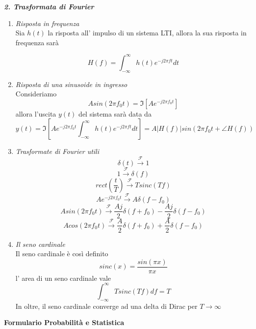 \documentclass[]{article}
\begin{document}
\textit{\textbf{2. Trasformata di Fourier}}

\begin{enumerate}
\item \textit{Risposta in frequenza}
\\
Sia $h(t)$ la risposta all' impulso di un sistema LTI, allora la sua risposta in frequenza sarà

\begin{equation}
H(f)= \int_{- \infty}^{\infty} h(t) e^{-j2 \pi f t} dt
\end{equation}

\item \textit{Risposta di una sinusoide in ingresso}
\\
Consideriamo 
\[ Asin(2 \pi f_0 t)= \Im \left[ Ae^{-j2 \pi f_0 t} \right]\]
allora l'uscita $y(t)$ del sistema sarà data da
\begin{equation}
y(t)= \Im \left[ Ae^{-j2 \pi f_0 t} \int_{- \infty}^{\infty} h(t) e^{-j2 \pi f t} dt \right]= A |H(f)| sin( 2 \pi f_0 t + \angle H(f))
\end{equation}
\item \textit{Trasformate di Fourier utili}
\[\delta(t) \xrightarrow{\mathscr{F}}  1\]
\[1 \xrightarrow{\mathscr{F}}  \delta(f)\]
\[rect \left( \frac{t}{T} \right) \xrightarrow{\mathscr{F}}  T sinc(Tf)\]
\[Ae^{-j2 \pi f_0 t} \xrightarrow{\mathscr{F}} A \delta(f-f_0) \]
\[Asin(2 \pi f_0 t) \xrightarrow{\mathscr{F}}  \frac{Aj}{2} \delta(f+f_0) - \frac{Aj}{2} \delta(f-f_0)\]
\[Acos(2 \pi f_0 t) \xrightarrow{\mathscr{F}}  \frac{A}{2} \delta(f+f_0) + \frac{A}{2} \delta(f-f_0)\]

\item \textit{Il seno cardinale}
\\
Il seno cardinale è così definito
\begin{equation}
sinc(x)= \frac{sin(\pi x)}{\pi x}
\end{equation}
l' area di un seno cardinale vale
\begin{equation}
\int_{- \infty}^{\infty} Tsinc(Tf) df = T
\end{equation}
In oltre, il seno cardinale converge ad una delta di Dirac per $T \to \infty$
\end{enumerate}



\newpage









\begin{center}
\begin{Large}
\textbf{Formulario Probabilità e Statistica}
\end{Large}
\end{center}
\end{document}
